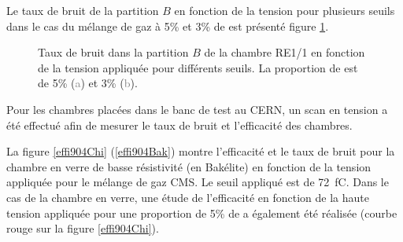  Le taux de bruit de la partition $B$ en fonction de la tension pour plusieurs seuils dans le cas du mélange de gaz à 5\% et 3\% de  est présenté figure \ref{bruitB2}.
  
\begin{figure}[ht!]
	\centering
	\hfill
	\caption{Taux de bruit dans la partition $B$ de la chambre RE1/1 en fonction de la tension appliquée pour différents seuils. La proportion de  est de \num{5}\% (\textcolor{gray}{a}) et \num{3}\% (\textcolor{gray}{b}).}
    \label{bruitB2}
\end{figure}  
  
Pour les chambres placées dans le banc de test au CERN, un scan en tension a été effectué afin de mesurer le taux de bruit et l'efficacité des chambres.

La figure \ref{effi904Chi} (\ref{effi904Bak}) montre l'efficacité et le taux de bruit pour la chambre en verre de basse résistivité (en Bakélite) en fonction de la tension appliquée pour le mélange de gaz CMS. Le seuil appliqué est de \SI{72}{\femto\coulomb}. Dans le cas de la chambre en verre, une étude de l'efficacité en fonction de la haute tension appliquée pour une proportion de \num{5}\% de  a également été réalisée (courbe rouge sur la figure \ref{effi904Chi}).
 

